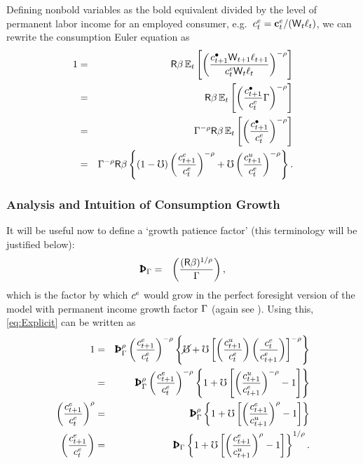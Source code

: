 \message{ !name(TractableBufferStock.tex)}\documentclass{handout}
\begin{document}
Defining nonbold variables as the bold equivalent divided
by the level of permanent labor income for an employed consumer, e.g.\ $c^{e}_{t}=\mathbf{c}^{e}_{t}/(\mathsf{W}_{t}\ell_{t})$, we can rewrite the
consumption Euler equation as
\begin{eqnarray}
  1         & = & \mathsf{R}\beta \operatorname{\mathbb{E}}_{t}\left[\left(\frac{{c}^{\bullet}_{t+1}\mathsf{W}_{t+1}\ell_{t+1}}{c^{e}_{t}\mathsf{W}_{t}\ell_{t}}\right)^{-\rho} \right]  \label{eq:ceuler}
\\          & = & \mathsf{R}\beta \operatorname{\mathbb{E}}_{t}\left[\left(\frac{{c}^{\bullet}_{t+1}}{c^{e}_{t}}\Gamma\right)^{-\rho} \right]
\\          & = & \Gamma^{-\rho}\mathsf{R}\beta \operatorname{\mathbb{E}}_{t}\left[\left(\frac{{c}^{\bullet}_{t+1}}{c^{e}_{t}}\right)^{-\rho} \right] \label{eq:cEulerRaw}
\\          & = & \Gamma^{-\rho}\mathsf{R}\beta \left\{(1-\mho)\left(\frac{c^{e}_{t+1}}{c^{e}_{t}}\right)^{-\rho}+\mho \left(\frac{c^{u}_{t+1}}{c^{e}_{t}}\right)^{-\rho}\right\} \label{eq:Explicit}.
\end{eqnarray}


\subsubsection{Analysis and Intuition of Consumption Growth}
It will be useful now to define a `growth patience factor' (this terminology will be justified below):
\begin{eqnarray}
  \PatPGro & = & \left(\frac{(\Rfree\Discount)^{1/\CRRA}}{\PGro}\right), \label{eq:PatPGro}
\end{eqnarray}
which is the factor by which $c^{e}$ would grow in the
perfect foresight version of the model with permanent income growth factor
$\Gamma$ (again see ).  
Using this,
\eqref{eq:Explicit} can be written as
\begin{eqnarray}
        1  & = & \PatPGro^{\CRRA} \left(\frac{\cRatE_{t+1}}{\cRatE_{t}}\right)^{-\CRRA} \left\{\erate+\urate\left[\left(\frac{\cU_{t+1}}{\cRatE_{t}}\right)\left(\frac{\cRatE_{t}}{\cRatE_{t+1}}\right)\right]^{-\CRRA}\right\}
\\       & = & \PatPGro^{\CRRA} \left(\frac{\cRatE_{t+1}}{\cRatE_{t}}\right)^{-\CRRA} \left\{1+\urate\left[\left(\frac{\cU_{t+1}}{\cRatE_{t+1}}\right)^{-\CRRA}-1\right]\right\} \label{eq:BeforePFStep}
\\       \left(\frac{\cRatE_{t+1}}{\cRatE_{t}}\right)^{\CRRA} & = & \PatPGro^{\CRRA} \left\{1+\urate\left[\left(\frac{\cRatE_{t+1}}{\cU_{t+1}}\right)^{\CRRA}-1\right]\right\} \label{eq:ctp1Oct}
\\       \left(\frac{\cRatE_{t+1}}{\cRatE_{t}}\right) & = & {\PatPGro} \left\{1+\urate\left[\left(\frac{\cRatE_{t+1}}{\cU_{t+1}}\right)^{\CRRA}-1\right]\right\}^{1/\CRRA}. \label{eq:cedel}
\end{eqnarray}
\end{document}
